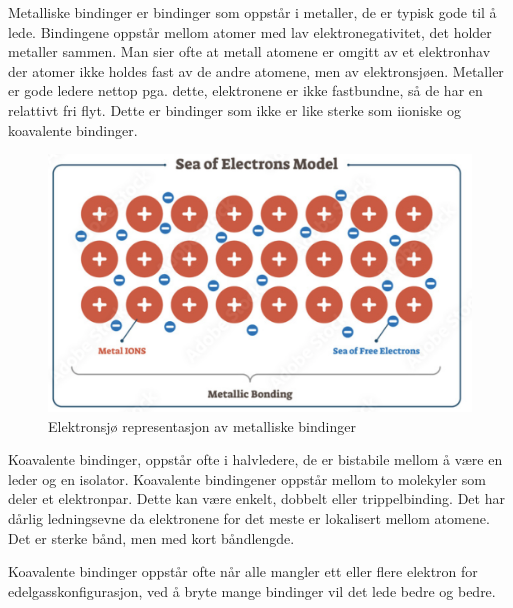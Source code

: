 Metalliske bindinger er bindinger som oppstår i metaller, de er typisk gode til å lede. Bindingene oppstår mellom atomer med lav elektronegativitet, det holder metaller sammen. Man sier ofte at metall atomene er omgitt av et elektronhav der atomer ikke holdes fast av de andre atomene, men av elektronsjøen. Metaller er gode ledere nettop pga. dette, elektronene er ikke fastbundne, så de har en relattivt fri flyt. Dette er bindinger som ikke er like sterke som iioniske og koavalente bindinger. 

\begin{figure}[!htb]
    \centering
    \includegraphics[scale=0.4]{Bilder/SamtaleTema3/Bindinger/metallic.png}
    \caption{Elektronsjø representasjon av metalliske bindinger}
    \label{fig:metallisk}
\end{figure}

Koavalente bindinger, oppstår ofte i halvledere, de er bistabile mellom å være en leder og en isolator. Koavalente bindingener oppstår mellom to molekyler som deler et elektronpar. Dette kan være enkelt, dobbelt eller trippelbinding. Det har dårlig ledningsevne da elektronene for det meste er lokalisert mellom atomene. Det er sterke bånd, men med kort båndlengde. 

Koavalente bindinger oppstår ofte når alle mangler ett eller flere elektron for edelgasskonfigurasjon, ved å bryte mange bindinger vil det lede bedre og bedre. 

